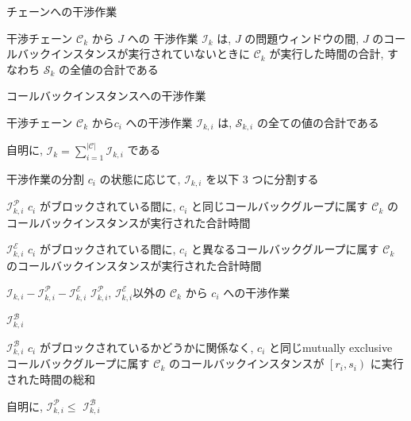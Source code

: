 \begin{frame}{チェーンへの干渉作業}
    \begin{definition}[チェーンへの干渉作業]
        干渉チェーン $\mathcal{C}_{k}$ から $J$ への 干渉作業 $\mathcal{I}_{k}$ は, $J$ の問題ウィンドウの間, $J$ のコールバックインスタンスが実行されていないときに $\mathcal{C}_{k}$ が実行した時間の合計, すなわち $\mathcal{S}_{k}$ の全値の合計である
    \end{definition}
\end{frame}

\begin{frame}{コールバックインスタンスへの干渉作業}
    \begin{definition}[コールバックインスタンスへの干渉作業]
        干渉チェーン $\mathcal{C}_{k}$ から$c_{i}$ への干渉作業 $\mathcal{I}_{k, i}$ は, $\mathcal{S}_{k, i}$ の全ての値の合計である
    \end{definition}
    \vspace{5mm}
    自明に, $\mathcal{I}_{k}=\sum_{i=1}^{|\mathcal{C}|} \mathcal{I}_{k, i}$ である
\end{frame}

\begin{frame}{干渉作業の分割}
    \vspace{-1mm}
    $c_{i}$ の状態に応じて, $\mathcal{I}_{k, i}$ を以下 3 つに分割する
    \vspace{-1mm}
    \begin{block}{$\mathcal{I}_{k, i}^{\mathcal{P}}$}
        $c_{i}$ がブロックされている間に, $c_{i}$ と同じコールバックグループに属す $\mathcal{C}_{k}$ のコールバックインスタンスが実行された合計時間
    \end{block}
    \begin{block}{$\mathcal{I}_{k, i}^{\mathcal{E}}$}
        $c_{i}$ がブロックされている間に, $c_{i}$ と異なるコールバックグループに属す $\mathcal{C}_{k}$ のコールバックインスタンスが実行された合計時間
    \end{block}
    \begin{block}{$\mathcal{I}_{k, i}-\mathcal{I}_{k, i}^{\mathcal{P}}-\mathcal{I}_{k, i}^{\mathcal{E}}$}
        $\mathcal{I}_{k, i}^{\mathcal{P}}$, $\mathcal{I}_{k, i}^{\mathcal{E}}$以外の $\mathcal{C}_{k}$ から $c_{i}$ への干渉作業
    \end{block}
\end{frame}

\begin{frame}{$\mathcal{I}_{k, i}^{\mathcal{B}}$}
    \begin{block}{$\mathcal{I}_{k, i}^{\mathcal{B}}$}
        $c_{i}$ がブロックされているかどうかに関係なく, $c_{i}$ と同じmutually exclusive コールバックグループに属す $\mathcal{C}_{k}$ のコールバックインスタンスが $\left[r_{i}, s_{i}\right)$ に実行された時間の総和
    \end{block}
    \vspace{5mm}
    自明に, $\mathcal{I}_{k, i}^{\mathcal{P}} \leq$  $\mathcal{I}_{k, i}^{\mathcal{B}}$
\end{frame}

